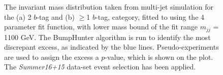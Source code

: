 \begin{figure}[!ht]
  \begin{center}
   \captionsetup[subfigure]{aboveskip=0pt,justification=centering}
  \end{center}
  \caption{ The invariant mass distribution taken from multi-jet simulation for the (a) 2 $b$-tag and (b) $\geq$1 $b$-tag,
   category, fitted to using the 4 parameter fit function, with lower mass bound of the fit range $m_{jj}$ = 1100 GeV.
   The BumpHunter algorithm is run to identify the most discrepant excess, as indicated by the blue lines.
   Pseudo-experiments are used to assign the excess a $p$-value, which is shown on the plot.    
   The \textit{Summer16+15} data-set event selection has been applied.}
 \label{fig:Short_4para_1100_figure1}
\end{figure}


